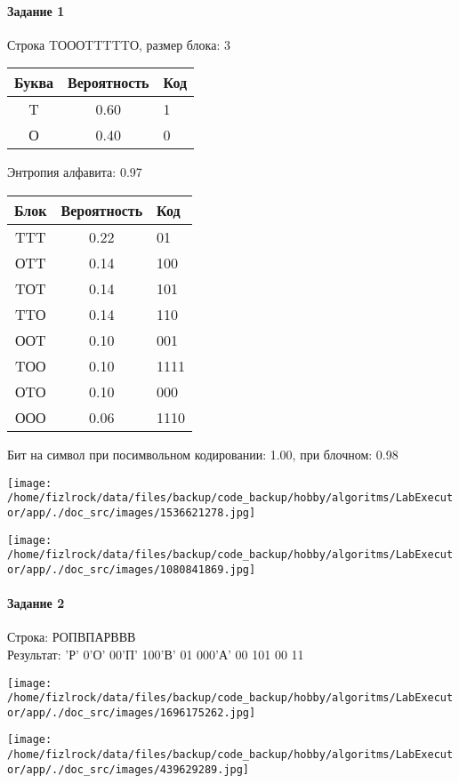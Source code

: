 \documentclass[a4paper, 12pt]{article}
\begin{document}
\paragraph{Задание 1}

Строка TОООTTTTTО, размер блока: 3
\begin{center}
 \begin{tabular}{ |c|c|l| } 
  \hline
     Буква & Вероятность & Код\\ \hline
T & 0.60 & 1\\\hline
О & 0.40 & 0
\\ \hline \end{tabular}
\end{center}
Энтропия алфавита: 0.97
\begin{center}
 \begin{tabular}{ |c|c|l| } 
  \hline
     Блок & Вероятность & Код\\ \hline
TTT & 0.22 & 01\\\hline
ОTT & 0.14 & 100\\\hline
TОT & 0.14 & 101\\\hline
TTО & 0.14 & 110\\\hline
ООT & 0.10 & 001\\\hline
TОО & 0.10 & 1111\\\hline
ОTО & 0.10 & 000\\\hline
ООО & 0.06 & 1110
\\ \hline \end{tabular}
\end{center}
Бит на символ при посимвольном кодировании: 1.00, при блочном: 0.98

\texttt{[image: /home/fizlrock/data/files/backup/code\_backup/hobby/algoritms/LabExecutor/app/./doc\_src/images/1536621278.jpg]}

\texttt{[image: /home/fizlrock/data/files/backup/code\_backup/hobby/algoritms/LabExecutor/app/./doc\_src/images/1080841869.jpg]}
\pagebreak
\paragraph{Задание 2}

Строка: 
РОПВПАРВВВ\\
Результат: 'Р' 0'О' 00'П' 100'В' 01 000'А' 00 101 00 11

\texttt{[image: /home/fizlrock/data/files/backup/code\_backup/hobby/algoritms/LabExecutor/app/./doc\_src/images/1696175262.jpg]}

\texttt{[image: /home/fizlrock/data/files/backup/code\_backup/hobby/algoritms/LabExecutor/app/./doc\_src/images/439629289.jpg]}
\end{document}

